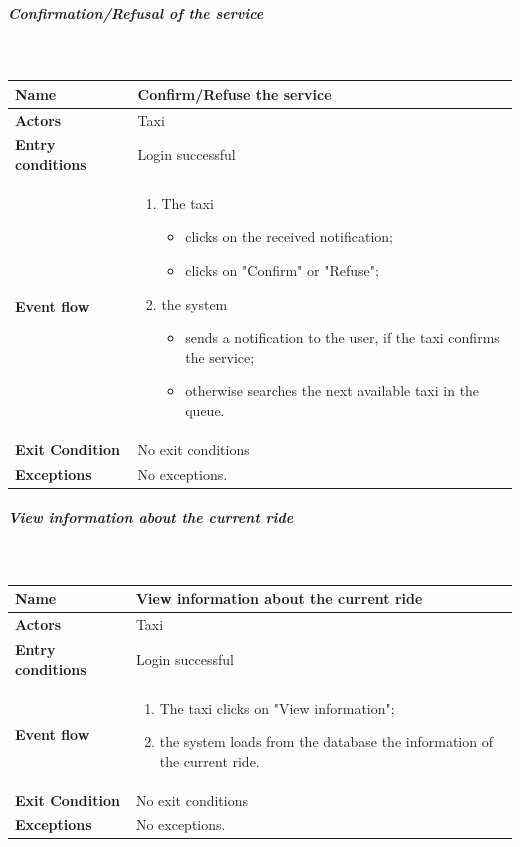 \newpage
\subparagraph{Confirmation/Refusal of the service}
~\\[0.2cm]
\vspace{20pt}
\noindent
\begin{tabular}{l l}
 \textbf {Name} & Confirm/Refuse the service  \\ \hline
 \textbf{Actors} & Taxi \\ \hline
 \textbf{Entry conditions} & Login successful \\ \hline
 \textbf{Event flow} & 
 \parbox{0.7\textwidth}{
 \begin{enumerate}
 \item The taxi
 \begin{itemize}
 \item clicks on the received notification;
 \item clicks on "Confirm" or "Refuse";
 \end{itemize}
 \item the system
  \begin{itemize}
 \item sends a notification to the user, if the taxi confirms the service;
 \item otherwise searches the next available taxi in the queue.
 \end{itemize}
 \end{enumerate}
 } \\ \hline
 \textbf{Exit Condition} & No exit conditions \\ \hline
 \textbf{Exceptions} & No exceptions.
\end{tabular}

\subparagraph{View information about the current ride}
~\\[0.2cm]
\vspace{20pt}
\noindent
\begin{tabular}{l l}
 \textbf {Name} & View information about the current ride  \\ \hline
 \textbf{Actors} & Taxi \\ \hline
 \textbf{Entry conditions} & Login successful \\ \hline
 \textbf{Event flow} & 
 \parbox{0.7\textwidth}{
 \begin{enumerate}
 \item The taxi clicks on "View information";
 \item the system loads from the database the information of the current ride.
 \end{enumerate}
 } \\ \hline
 \textbf{Exit Condition} & No exit conditions \\ \hline
 \textbf{Exceptions} & No exceptions.
\end{tabular}


